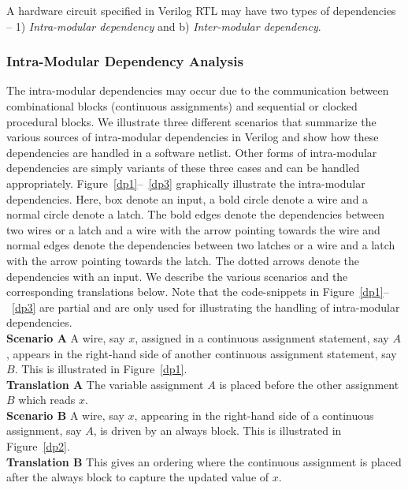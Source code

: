 %
A hardware circuit specified in Verilog RTL may have two types of dependencies -- 
1) \emph{Intra-modular dependency} and b) \emph{Inter-modular dependency}. 
%
\subsubsection{Intra-Modular Dependency Analysis}
%
The intra-modular dependencies may occur due to the communication between
combinational blocks (continuous assignments) and sequential or clocked 
procedural blocks.  We illustrate three different scenarios that summarize 
the various sources of intra-modular dependencies in Verilog and show 
how these dependencies are handled in a software netlist.  Other forms of 
intra-modular dependencies are simply variants of these three cases 
and can be handled appropriately.
%
Figure~\ref{dp1}--~\ref{dp3} graphically illustrate the intra-modular dependencies.  
%
Here, box denote an input, a bold circle denote a wire and a normal circle
denote a latch.  The bold edges denote the dependencies between two wires or a latch 
and a wire with the arrow pointing towards the wire and normal edges denote the 
dependencies between two latches or a wire and a latch with the arrow pointing
towards the latch. The dotted arrows denote the dependencies with an input. 
%
We describe the various scenarios and the corresponding translations below. 
Note that the code-snippets in Figure~\ref{dp1}--~\ref{dp3} are partial 
and are only used for illustrating the handling of intra-modular dependencies.
\\
%
\noindent \textbf{Scenario A}  A wire, say $x$,  assigned in a continuous assignment 
statement, say $A$, appears in the right-hand side of another continuous assignment 
statement, say $B$.  This is illustrated in Figure~\ref{dp1}.\\

\noindent \textbf{Translation A} The variable assignment $A$ is placed before the other assignment $B$ 
which reads $x$.  \\

\noindent \textbf{Scenario B} A wire, say $x$, appearing in the right-hand side of a 
continuous assignment, say $A$, is driven by an always block.  This is illustrated in 
Figure~\ref{dp2}.\\

\noindent \textbf{Translation B} This gives an ordering where the continuous assignment is 
placed after the always block to capture the updated value of $x$. \\

